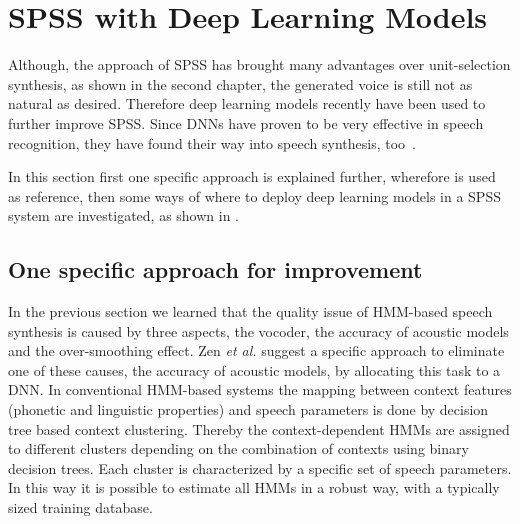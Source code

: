 \section{\ac{SPSS} with Deep Learning Models}
\label{sec:deepspeech}

Although, the approach of \ac{SPSS} has brought many advantages over unit-selection synthesis, as shown in the second chapter, the generated voice is still not as natural as desired. Therefore deep learning models recently have been used to further improve \ac{SPSS}. Since \acfp{DNN} have proven to be very effective in speech recognition, they have found their way into speech synthesis, too~\cite{hashimoto:effect}. %

In this section first one specific approach is explained further, wherefore \cite{zen:deepstatistical} is used as reference, then some ways of where to deploy deep learning models in a \ac{SPSS} system are investigated, as shown in \cite{hashimoto:effect}.

\subsection{One specific approach for improvement}
\label{subsec:deepspss}

In the previous section we learned that the quality issue of \ac{HMM}-based speech synthesis is caused by three aspects, the vocoder, the accuracy of acoustic models and the over-smoothing effect. Zen \textit{et al.} \cite{zen:deepstatistical} suggest a specific approach to eliminate one of these causes, the accuracy of acoustic models, by allocating this task to a \ac{DNN}. In conventional \ac{HMM}-based systems the mapping between context features (phonetic and linguistic properties) and speech parameters is done by decision tree based context clustering. Thereby the context-dependent \acp{HMM} are assigned to different clusters depending on the combination of contexts using binary decision trees. Each cluster is characterized by a specific set of speech parameters. In this way it is possible to estimate all \acp{HMM} in a robust way, with a typically sized training database.

